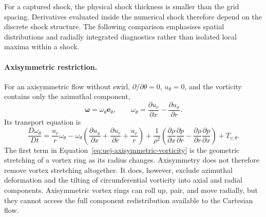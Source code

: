 For a captured shock, the physical shock thickness is smaller than the grid
spacing. Derivatives evaluated inside the numerical shock therefore depend on
the discrete shock structure. The following comparison emphasises spatial
distributions and radially integrated diagnostics rather than isolated local
maxima within a shock.

\paragraph{Axisymmetric restriction.}
For an axisymmetric flow without swirl,
\(\partial/\partial\theta=0\), \(u_\theta=0\), and the vorticity contains only
the azimuthal component,
\[
    \boldsymbol{\omega}=\omega_\theta\boldsymbol{e}_\theta,
    \qquad
    \omega_\theta
    =\frac{\partial u_r}{\partial x}
    -\frac{\partial u_x}{\partial r}.
\]
Its transport equation is
\begin{equation}
    \frac{D\omega_\theta}{Dt}
    =
    \frac{u_r}{r}\omega_\theta
    -\omega_\theta\left(
        \frac{\partial u_x}{\partial x}
        +\frac{\partial u_r}{\partial r}
        +\frac{u_r}{r}\right)
    +\frac{1}{\rho^2}\left(
        \frac{\partial\rho}{\partial x}\frac{\partial p}{\partial r}
        -\frac{\partial\rho}{\partial r}\frac{\partial p}{\partial x}
      \right)
    +T_{v,\theta}.
    \label{eq:uej-axisymmetric-vorticity}
\end{equation}
The first term in Equation~\eqref{eq:uej-axisymmetric-vorticity} is the
geometric stretching of a vortex ring as its radius changes. Axisymmetry does
not therefore remove vortex stretching altogether. It does, however, exclude
azimuthal deformation and the tilting of circumferential vorticity into axial
and radial components. Axisymmetric vortex rings can roll up, pair, and move
radially, but they cannot access the full component redistribution available
to the Cartesian flow.

